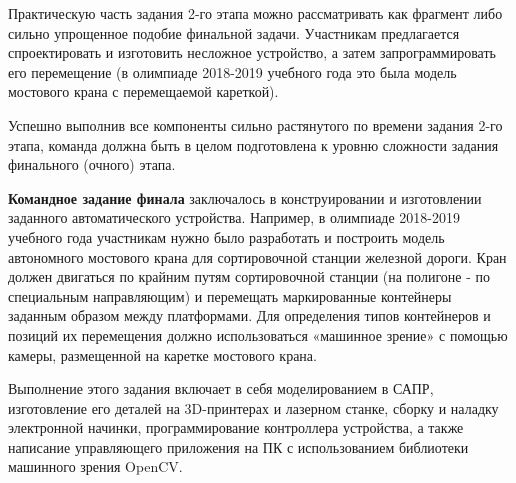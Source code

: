 Практическую часть задания 2-го этапа можно рассматривать как фрагмент либо сильно упрощенное подобие финальной задачи. Участникам предлагается спроектировать и изготовить несложное устройство, а затем запрограммировать его перемещение (в олимпиаде 2018-2019 учебного года это была модель мостового крана с перемещаемой кареткой).

Успешно выполнив все компоненты сильно растянутого по времени задания 2-го этапа, команда должна быть в целом подготовлена к уровню сложности задания финального (очного) этапа.

\textbf{Командное задание финала} заключалось в конструировании и изготовлении заданного автоматического устройства. Например, в олимпиаде 2018-2019 учебного года участникам нужно было разработать и построить модель автономного мостового крана для сортировочной станции железной дороги. Кран должен двигаться по крайним путям сортировочной станции (на полигоне - по специальным направляющим) и перемещать маркированные контейнеры заданным образом между платформами. Для определения типов контейнеров и позиций их перемещения должно использоваться «машинное зрение» с помощью камеры, размещенной на каретке мостового крана.

Выполнение этого задания включает в себя моделированием в САПР, изготовление его деталей на 3D-принтерах и лазерном станке, сборку и наладку электронной начинки, программирование контроллера устройства, а также написание управляющего приложения на ПК с использованием библиотеки машинного зрения OpenCV.

\clearpage
\endgroup